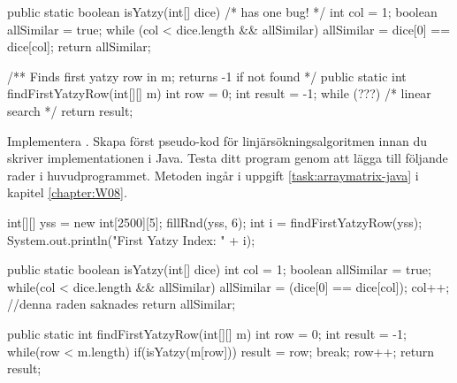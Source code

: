 \begin{Code}[language=Java]
    public static boolean isYatzy(int[] dice){ /* has one bug! */
        int col = 1;
        boolean allSimilar = true;
        while (col < dice.length && allSimilar) {
          allSimilar = dice[0] == dice[col];
        }
        return allSimilar;
    }

    /** Finds first yatzy row in m; returns -1 if not found */
    public static int findFirstYatzyRow(int[][] m){
        int row = 0;
        int result = -1;
        while (???) {
             /* linear search  */
        }
        return result;
    }
\end{Code}


\Subtask Implementera . Skapa först pseudo-kod för linjärsökningsalgoritmen innan du skriver implementationen i Java.
Testa ditt program genom att lägga till följande rader i huvudprogrammet.
Metoden  ingår i uppgift \ref{task:arraymatrix-java} i kapitel \ref{chapter:W08}.
\begin{Code}[language=Java]
        int[][] yss = new int[2500][5];
        fillRnd(yss, 6);
        int i = findFirstYatzyRow(yss);
        System.out.println("First Yatzy Index: " + i);
\end{Code}




\SOLUTION


\TaskSolved \what


\SubtaskSolved
\begin{Code}[language=Java]
public static boolean isYatzy(int[] dice){
    int col = 1;
    boolean allSimilar = true;
    while(col < dice.length && allSimilar){
        allSimilar = (dice[0] == dice[col]);
        col++; //denna raden saknades
    }
    return allSimilar;
}
\end{Code}

\SubtaskSolved

\begin{Code}[language=Java]
public static int findFirstYatzyRow(int[][] m){
    int row = 0;
    int result = -1;
    while(row < m.length){
        if(isYatzy(m[row])){
           result = row;
           break;
        }
        row++;
    }
    return result;
}
\end{Code}



\QUESTEND







